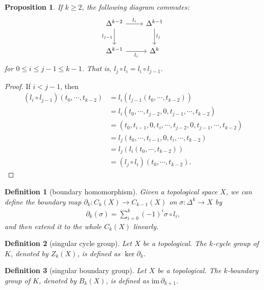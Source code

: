 \documentclass{report}
\newtheorem{definition}{Definition}[section]
\newtheorem{proposition}{Proposition}[section]
\theoremstyle{nonumberplain}
\newtheorem{proof}{Proof.}
\begin{document}
\begin{proposition}
	If $k\ge 2$, the following diagram commutes:
	\begin{equation*}
		\begin{tikzcd}
			\Delta^{k-2} \arrow[r, "l_i"] \arrow[d, "l_{j-1}"']
			& \Delta^{k-1}  \arrow[d, "l_{j}"] \\ [5pt]
			\Delta^{k-1}  \arrow[r, "l_i"']
			&  \Delta^{k} 
		\end{tikzcd}			
	\end{equation*}
	for $0\le i\le j-1\le k-1$. That is, $l_j\circ l_i=l_i\circ l_{j-1}$.
\end{proposition}
\begin{proof}
	If $i<j-1$, then
	\[
	\begin{aligned}
		\left(l_i\circ l_{j-1}\right)(t_0, \cdots, t_{k-2})&=l_i\left(l_{j-1}(t_0, \cdots, t_{k-2})\right)\\
		&=l_i\left(t_0, \cdots, t_{j-2}, 0, t_{j-1}, \cdots, t_{k-2}\right)\\
		&=\left(t_0, t_{i-1},0,t_{i},\cdots, t_{j-2}, 0, t_{j-1}, \cdots, t_{k-2}\right)\\
		&=l_j\left(t_0, \cdots, t_{i-1}, 0, t_{i}, \cdots, t_{k-2}\right)\\
		&=l_j\left(l_i(t_0, \cdots, t_{k-2})\right)\\
		&=(l_j \circ l_i)(t_0, \cdots, t_{k-2}).
	\end{aligned}
	\]
\end{proof}

\begin{definition}[boundary homomorphism]
	Given a topological space $X$, we can define the boundary map $\partial_k:C_k(X)\rightarrow C_{k-1}(X)$ on $\sigma:\Delta^k\to X$ by
	\begin{align*}
		\partial_k\left(\sigma\right)=\sum_{i=0}^k(-1)^{i}\sigma\circ l_i,
	\end{align*}
	and then extend it to the whole $C_k(X)$ linearly.
\end{definition}

\begin{definition}[singular cycle group]
	Let $X$ be a topological. The $k$-cycle group of $K$, denoted by $Z_k(X)$,  is defined as $\ker\partial_k$.
\end{definition}

\begin{definition}[singular boundary group]
	Let $X$ be a topological. The $k$-boundary group of $K$, denoted by $B_k(X)$, is defined as $\mathrm{im}\,\partial_{k+1}$.
\end{definition}
\end{document}
